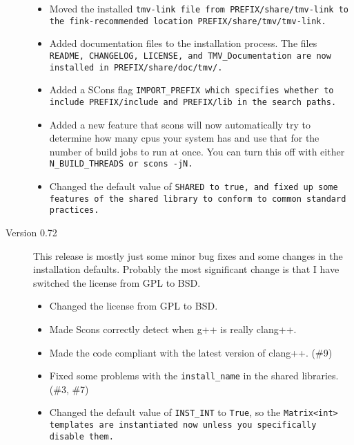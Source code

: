 \begin{description}
\begin{itemize}
\item
Moved the installed \tt{tmv-link} file from \tt{PREFIX/share/tmv-link} to the fink-recommended location \tt{PREFIX/share/tmv/tmv-link}.

\item
Added documentation files to the installation process.  The files \tt{README},
\tt{CHANGELOG}, \tt{LICENSE}, and \tt{TMV\_Documentation} are now installed in
\tt{PREFIX/share/doc/tmv/}.

\item
Added a SCons flag \tt{IMPORT\_PREFIX} which specifies whether to include
\tt{PREFIX/include} and \tt{PREFIX/lib} in the search paths.

\item
Added a new feature that scons will now automatically try to determine 
how many cpus your system has and use that for the number of build jobs 
to run at once.  You can turn this off with either \tt{N\_BUILD\_THREADS} or \tt{scons -jN}.

\item
Changed the default value of \tt{SHARED} to true, and fixed up some features of the shared
library to conform to common standard practices.

\end{itemize}

\item[Version 0.72]

This release is mostly just some minor bug fixes and some changes in the 
installation defaults.  Probably the most significant change is that I have
switched the license from GPL to BSD.  

\begin{itemize}

\item Changed the license from GPL to BSD.

\item
Made Scons correctly detect when g++ is really clang++.

\item
Made the code compliant with the latest version of clang++. (\#9)

\item
Fixed some problems with the \texttt{install\_name} in the shared libraries.  
(\#3, \#7)

\item
Changed the default value of \texttt{INST\_INT} to \texttt{True}, so the \tt{Matrix<int>}
templates are instantiated now unless you specifically disable them.


\end{itemize}
\end{description}
